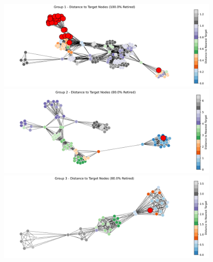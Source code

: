 \documentclass{article}
\begin{document}
\begin{figure}[H]

    \begin{minipage}{0.5\textwidth}
        \includegraphics[width=\linewidth]{png_figs/shortest_path/group_1_vulnerability.png}  
    \end{minipage}%
    \begin{minipage}{0.5\textwidth}
        \includegraphics[width=\linewidth]{png_figs/shortest_path/group_2_vulnerability.png}  
    \end{minipage}
    \begin{minipage}{0.5\textwidth}
        \includegraphics[width=\linewidth]{png_figs/shortest_path/group_3_vulnerability.png}  
    \end{minipage}%
    \begin{minipage}{0.4\textwidth}
        \raggedleft
        
    \end{minipage}
        

\end{figure}
\end{document}
